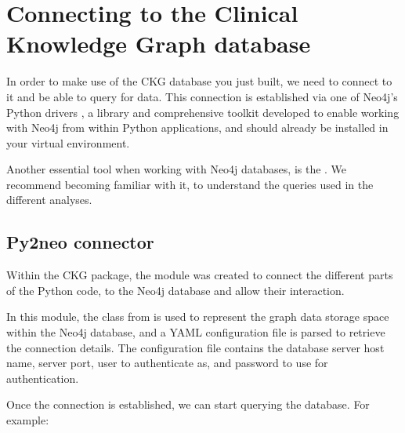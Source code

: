 \documentclass[letterpaper,10pt,english]{sphinxmanual}
\begin{document}
\section{Connecting to the Clinical Knowledge Graph database}
\label{\detokenize{getting_started/connect-to-ckg:connecting-to-the-clinical-knowledge-graph-database}}\label{\detokenize{getting_started/connect-to-ckg::doc}}
In order to make use of the CKG database you just built, we need to connect to it and be able to query for data.
This connection is established via one of Neo4j’s Python drivers , a library and comprehensive toolkit developed to enable working with Neo4j from within Python applications, and should already be installed in your virtual environment.

Another essential tool when working with Neo4j databases, is the . We recommend becoming familiar with it, to understand the queries used in the different analyses.


\subsection{Py2neo connector}
\label{\detokenize{getting_started/connect-to-ckg:py2neo-connector}}
Within the CKG package, the  module was created to connect the different parts of the Python code, to the Neo4j database and allow their interaction.

In this module, the  class from  is used to represent the graph data storage space within the Neo4j database, and a YAML configuration file is parsed to retrieve the connection details. The configuration file  contains the database server host name, server port, user to authenticate as, and password to use for authentication.

\begin{sphinxVerbatim}[commandchars=\\\{\}]
   
  
\end{sphinxVerbatim}

Once the connection is established, we can start querying the database. For example:
\end{document}
